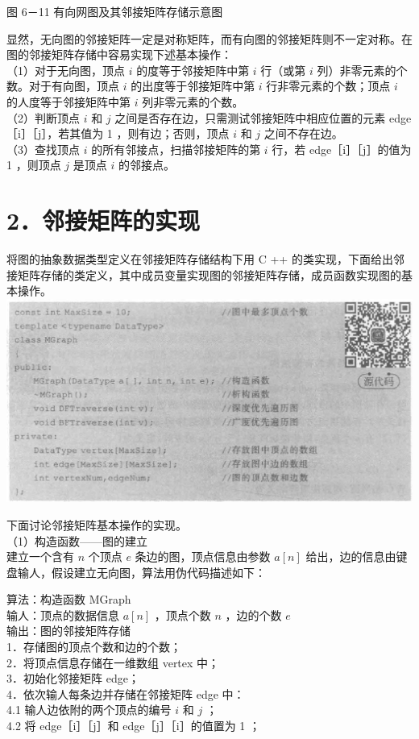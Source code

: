 \documentclass[10pt]{article}
\begin{document}
图 6－11 有向网图及其邻接矩阵存储示意图

显然，无向图的邻接矩阵一定是对称矩阵，而有向图的邻接矩阵则不一定对称。在图的邻接矩阵存储中容易实现下述基本操作：\\
（1）对于无向图，顶点 $i$ 的度等于邻接矩阵中第 $i$ 行（或第 $i$ 列）非零元素的个数。对于有向图，顶点 $i$ 的出度等于邻接矩阵中第 $i$ 行非零元素的个数；顶点 $i$ 的人度等于邻接矩阵中第 $i$ 列非零元素的个数。\\
（2）判断顶点 $i$ 和 $j$ 之间是否存在边，只需测试邻接矩阵中相应位置的元素 edge［i］［j］，若其值为 1 ，则有边；否则，顶点 $i$ 和 $j$ 之间不存在边。\\
（3）查找顶点 $i$ 的所有邻接点，扫描邻接矩阵的第 $i$ 行，若 edge［i］［j］的值为 1 ，则顶点 $j$ 是顶点 $i$ 的邻接点。

\section*{2．邻接矩阵的实现}
将图的抽象数据类型定义在邻接矩阵存储结构下用 C ++ 的类实现，下面给出邻接矩阵存储的类定义，其中成员变量实现图的邻接矩阵存储，成员函数实现图的基本操作。\\
\includegraphics[max width=\textwidth, center]{2025_06_06_704745ea57b15b2333e5g-193}

下面讨论邻接矩阵基本操作的实现。\\
（1）构造函数——图的建立\\
建立一个含有 $n$ 个顶点 $e$ 条边的图，顶点信息由参数 $a[n]$ 给出，边的信息由键盘输人，假设建立无向图，算法用伪代码描述如下：

算法：构造函数 MGraph\\
输人：顶点的数据信息 $a[n]$ ，顶点个数 $n$ ，边的个数 $e$\\
输出：图的邻接矩阵存储\\
1．存储图的顶点个数和边的个数；\\
2．将顶点信息存储在一维数组 vertex 中；\\
3．初始化邻接矩阵 edge；\\
4．依次输人每条边并存储在邻接矩阵 edge 中：\\
4.1 输人边依附的两个顶点的编号 $i$ 和 $j$ ；\\
4.2 将 edge［i］［j］和 edge［j］［i］的值置为 1 ；
\end{document}
